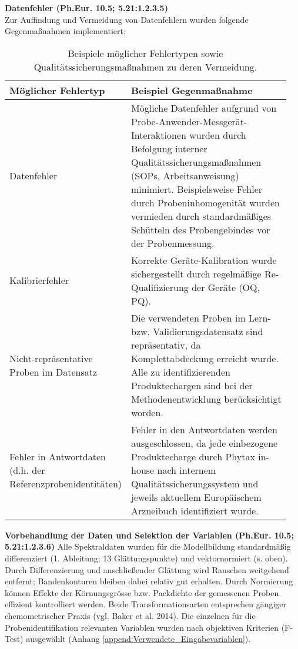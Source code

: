 \documentclass[11pt, a4paper]{article}
\newcommand\VersionPhEur{10.5}
\begin{document}
\textbf{Datenfehler (Ph.Eur. \VersionPhEur; 5.21:1.2.3.5)}\\[1.2pt]
Zur Auffindung und Vermeidung von Datenfehlern wurden folgende Gegenmaßnahmen implementiert:
\begin{table}[h]
\centering
\begin{tabular}{|p{0.35\linewidth} | p{0.6\linewidth}|}
\hline
\textbf{Möglicher Fehlertyp} &\textbf{Beispiel Gegenmaßnahme} \\
\hline
Datenfehler & Mögliche Datenfehler aufgrund von Probe-Anwender-Messgerät-Interaktionen wurden durch Befolgung interner Qualitätssicherungsmaßnahmen (SOPs, Arbeitsanweisung) minimiert. Beispielsweise Fehler durch Probeninhomogenität wurden vermieden durch standardmäßiges Schütteln des Probengebindes vor der Probenmessung.\\
\hline
Kalibrierfehler & Korrekte Geräte-Kalibration wurde sichergestellt durch regelmäßige Re-Qualifizierung der Geräte (OQ, PQ). \\
\hline
Nicht-repräsentative Proben im Datensatz & Die verwendeten Proben im Lern- bzw. Validierungsdatensatz sind repräsentativ, da Komplettabdeckung erreicht wurde. Alle zu identifizierenden Produktechargen sind bei der Methodenentwicklung berücksichtigt worden.\\
\hline
Fehler in Antwortdaten (d.h. der Referenzprobenidentitäten) & Fehler in den Antwortdaten werden ausgeschlossen, da jede einbezogene Produktecharge durch Phytax in-house nach internem Qualitätssicherungssystem und jeweils aktuellem Europäischem Arzneibuch identifiziert wurde. \\
\hline
\end{tabular}
\caption{Beispiele möglicher Fehlertypen sowie Qualitätssicherungsmaßnahmen zu deren Vermeidung.}
\end{table}

\textbf{Vorbehandlung der Daten und Selektion der Variablen (Ph.Eur. \VersionPhEur; 5.21:1.2.3.6)}
Alle Spektraldaten wurden für die Modellbildung standardmäßig differenziert (1. Ableitung; 13 Glättungspunkte) und vektornormiert (s. oben). Durch Differenzierung und anschließender Glättung wird Rauschen weitgehend entfernt; Bandenkonturen bleiben dabei relativ gut erhalten. Durch Normierung können Effekte der Körnungsgrösse bzw. Packdichte der gemessenen Proben effizient kontrolliert werden. Beide Transformationsarten entsprechen gängiger chemometrischer Praxis (vgl. Baker et al. 2014). Die einzelnen für die Probenidentifikation relevanten Variablen wurden nach objektiven Kriterien (F-Test) ausgewählt (Anhang \ref{append:Verwendete_Eingabevariablen}).
\end{document}
